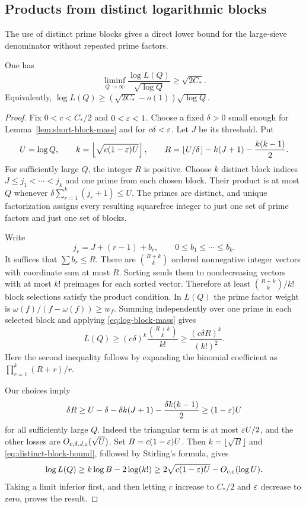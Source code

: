 \subsection{Products from distinct logarithmic blocks}
The use of distinct prime blocks gives a direct lower bound for
the large-sieve denominator without repeated prime factors.

\begin{proposition}\label{prop:sharper-L}
One has
\begin{equation}\label{eq:sharper-L}
 \liminf_{Q\to\infty}\frac{\log L(Q)}{\sqrt{\log Q}}
       \ge\sqrt{2C_*}.
\end{equation}
Equivalently,
$\log L(Q)\ge(\sqrt{2C_*}-o(1))\sqrt{\log Q}$.
\end{proposition}
\begin{proof}
Fix $0<c<C_*/2$ and $0<\varepsilon<1$. Choose a fixed $\delta>0$
small enough for Lemma~\ref{lem:short-block-mass} and for
$c\delta<\varepsilon$. Let $J$ be its threshold.
Put
\[
 U=\log Q,\qquad
 k=\left\lfloor\sqrt{c(1-\varepsilon)U}\right\rfloor,\qquad
 R=\lfloor U/\delta\rfloor-k(J+1)-\frac{k(k-1)}2.
\]
For sufficiently large $Q$, the integer $R$ is positive.
Choose $k$ distinct block indices
$J\le j_1<\cdots<j_k$ and one prime from each chosen block.
Their product is at most $Q$ whenever
$\delta\sum_{r=1}^k(j_r+1)\le U$.
The primes are distinct, and unique factorization assigns every
resulting squarefree integer to just one set of prime factors
and just one set of blocks.

Write
\[
 j_r=J+(r-1)+b_r,\qquad 0\le b_1\le\cdots\le b_k .
\]
It suffices that $\sum b_r\le R$. There are
$\binom{R+k}{k}$ ordered nonnegative integer vectors with
coordinate sum at most $R$. Sorting sends them to nondecreasing
vectors with at most $k!$ preimages for each sorted vector.
Therefore at least $\binom{R+k}{k}/k!$ block selections satisfy
the product condition. In $L(Q)$ the prime factor weight is
$\omega(f)/(f-\omega(f))\ge w_f$.
Summing independently over one prime in each selected block
and applying \eqref{eq:log-block-mass} gives
\begin{equation}\label{eq:distinct-block-bound}
 L(Q)\ge (c\delta)^k\frac{\binom{R+k}{k}}{k!}
       \ge\frac{(c\delta R)^k}{(k!)^2}.
\end{equation}
Here the second inequality follows by expanding the binomial
coefficient as $\prod_{r=1}^k(R+r)/r$.

Our choices imply
\[
 \delta R
 \ge U-\delta-\delta k(J+1)-\frac{\delta k(k-1)}2
 \ge (1-\varepsilon)U
\]
for all sufficiently large $Q$.
Indeed the triangular term is at most $\varepsilon U/2$, and the
other losses are $O_{c,\delta,J,\varepsilon}(\sqrt U)$.
Set $B=c(1-\varepsilon)U$. Then $k=\lfloor\sqrt B\rfloor$ and
\eqref{eq:distinct-block-bound}, followed by Stirling's formula,
gives
\[
 \log L(Q)\ge k\log B-2\log(k!)
 \ge 2\sqrt{c(1-\varepsilon)U}-O_{c,\varepsilon}(\log U).
\]
Taking a limit inferior first, and then letting $c$ increase
to $C_*/2$ and $\varepsilon$ decrease to zero, proves the result.
\end{proof}

